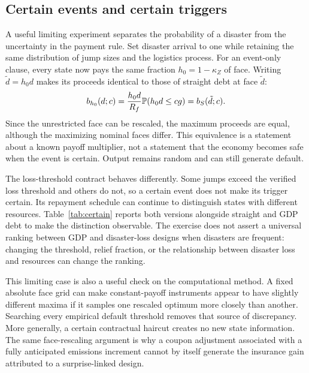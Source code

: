 \subsection{Certain events and certain triggers}\label{subsec:certain}
A useful limiting experiment separates the probability of a disaster from the uncertainty in the payment rule. Set disaster arrival to one while retaining the same distribution of jump sizes and the logistics process. For an event-only clause, every state now pays the same fraction $h_0=1-\kappa_Z$ of face. Writing $\tilde d=h_0d$ makes its proceeds identical to those of straight debt at face $\tilde d$:
\begin{equation}\label{eq:constant_payoff_equivalence}
 b_{h_0}(d;c)=\frac{h_0d}{R_f}\mathbb P(h_0d\le cg)=b_S(\tilde d;c).
\end{equation}
Since the unrestricted face can be rescaled, the maximum proceeds are equal, although the maximizing nominal faces differ. This equivalence is a statement about a known payoff multiplier, not a statement that the economy becomes safe when the event is certain. Output remains random and can still generate default.

\begin{table}[t]
\centering\caption{Certain disaster arrival with variable disaster sizes, stress parameters. The event-only contract has a constant payoff; the loss-threshold contract remains state-contingent. Parentheses are Monte Carlo SEs of the across-seed mean.}\label{tab:certain}
\FitTable{}
\end{table}
The loss-threshold contract behaves differently. Some jumps exceed the verified loss threshold and others do not, so a certain event does not make its trigger certain. Its repayment schedule can continue to distinguish states with different resources. Table~\ref{tab:certain} reports both versions alongside straight and GDP debt to make the distinction observable. The exercise does not assert a universal ranking between GDP and disaster-loss designs when disasters are frequent: changing the threshold, relief fraction, or the relationship between disaster loss and resources can change the ranking.

This limiting case is also a useful check on the computational method. A fixed absolute face grid can make constant-payoff instruments appear to have slightly different maxima if it samples one rescaled optimum more closely than another. Searching every empirical default threshold removes that source of discrepancy. More generally, a certain contractual haircut creates no new state information. The same face-rescaling argument is why a coupon adjustment associated with a fully anticipated emissions increment cannot by itself generate the insurance gain attributed to a surprise-linked design.
